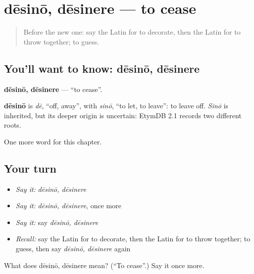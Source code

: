 \section[dēsinō, dēsinere]{dēsinō, dēsinere — to cease}

\label{lesson:LA-C204-desino}



\begin{quote}
Before the new one: say the Latin for to decorate, then the Latin for to throw together; to guess.
\end{quote}

\subsection*{You'll want to know: dēsinō, dēsinere}
\textbf{dēsinō, dēsinere} — \textquotedblleft{}to cease\textquotedblright{}.

\begin{cousinweb}
\textbf{dēsinō} is \emph{dē}, \textquotedblleft{}off, away\textquotedblright{}, with \emph{sinō}, \textquotedblleft{}to let, to leave\textquotedblright{}: to leave off. \emph{Sinō} is inherited, but its deeper origin is uncertain: EtymDB 2.1 records two different roots.
\end{cousinweb}

\begin{grammarlens}[title={What you've built}]
One more word for this chapter.
\end{grammarlens}

\subsection*{Your turn}
\begin{itemize}
\raggedright
  \item \emph{Say it:} \emph{dēsinō, dēsinere}
  \item \emph{Say it:} \emph{dēsinō, dēsinere}, once more
  \item \emph{Say it:} say \emph{dēsinō, dēsinere}
  \item \emph{Recall:} say the Latin for to decorate, then the Latin for to throw together; to guess, then say \emph{dēsinō, dēsinere} again
\end{itemize}

\begin{tcolorbox}[breakable,colback=teal!4,colframe=teal!35!black,title={Before you move on}]
What does dēsinō, dēsinere mean? (\textquotedblleft{}To cease\textquotedblright{}.) Say it once more.
\end{tcolorbox}
